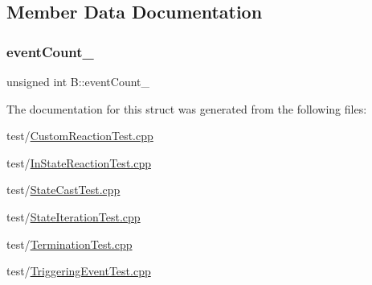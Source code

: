 \subsection{Member Data Documentation}
\mbox{\label{struct_b_a1a60275928b3599e275f5ba2c34b3a1b}} 
\subsubsection{\texorpdfstring{event\+Count\+\_\+}{eventCount\_}}
{\footnotesize\ttfamily unsigned int B\+::event\+Count\+\_\+}



The documentation for this struct was generated from the following files\+:\begin{DoxyCompactItemize}
\item 
test/\mbox{\hyperlink{_custom_reaction_test_8cpp}{Custom\+Reaction\+Test.\+cpp}}\item 
test/\mbox{\hyperlink{_in_state_reaction_test_8cpp}{In\+State\+Reaction\+Test.\+cpp}}\item 
test/\mbox{\hyperlink{_state_cast_test_8cpp}{State\+Cast\+Test.\+cpp}}\item 
test/\mbox{\hyperlink{_state_iteration_test_8cpp}{State\+Iteration\+Test.\+cpp}}\item 
test/\mbox{\hyperlink{_termination_test_8cpp}{Termination\+Test.\+cpp}}\item 
test/\mbox{\hyperlink{_triggering_event_test_8cpp}{Triggering\+Event\+Test.\+cpp}}\end{DoxyCompactItemize}
